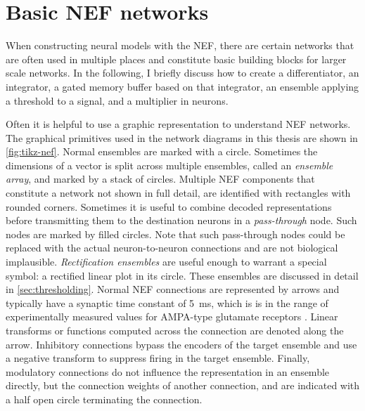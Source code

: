 \chapter{Basic NEF networks}
When constructing neural models with the NEF, there are certain networks that are often used in multiple places and constitute basic building blocks for larger scale networks.
In the following, I briefly discuss how to create a differentiator, an integrator, a gated memory buffer based on that integrator, an ensemble applying a threshold to a signal, and a multiplier in neurons.

Often it is helpful to use a graphic representation to understand NEF networks.
The graphical primitives used in the network diagrams in this thesis are shown in \cref{fig:tikz-nef}.
Normal ensembles are marked with a circle.
Sometimes the dimensions of a vector is split across multiple ensembles, called an \emph{ensemble array}, and marked by a stack of circles.
Multiple NEF components that constitute a network not shown in full detail, are identified with rectangles with rounded corners.
Sometimes it is useful to combine decoded representations before transmitting them to the destination neurons in a \emph{pass-through} node.
Such nodes are marked by filled circles.
Note that such pass-through nodes could be replaced with the actual neuron-to-neuron connections and are not biological implausible.
\emph{Rectification ensembles} are useful enough to warrant a special symbol: a rectified linear plot in its circle.
These ensembles are discussed in detail in \cref{sec:thresholding}.
Normal NEF connections are represented by arrows and typically have a synaptic time constant of \SI{5}{\milli\second}, which is is in the range of experimentally measured values for AMPA-type glutamate receptors \parencite{jonas1993,spruston1995-1}.
Linear transforms or functions computed across the connection are denoted along the arrow.
Inhibitory connections bypass the encoders of the target ensemble and use a negative transform to suppress firing in the target ensemble.
Finally, modulatory connections do not influence the representation in an ensemble directly, but the connection weights of another connection, and are indicated with a half open circle terminating the connection.

